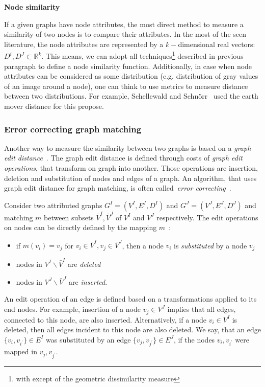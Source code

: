 \textbf{Node similarity}

If a given graphs have node attributes, the most direct method to measure a similarity of two nodes is to compare their attributes. In the most of the seen literature, the node attributes are represented by a $k-$dimensional real vectors: $D^i,D^J\subset\mathbb{R}^k$. This means, we can adopt all techniques\footnote{with except of the geometric dissimilarity measure} described in previous paragraph to define a node similarity function. Additionally, in case when node attributes can be considered as some distribution (e.g. distribution of gray values of an image around a node), one can think to use metrics to measure distance between two distributions. For example, Schellewald and Schn\"orr~\cite{Schellewald2005} used the earth mover distance for this propose.
\subsubsection{Error correcting graph matching}
Another way to measure the similarity between two graphs is based on a \emph{graph edit distance}~\cite{Bunke1983_inexactGM}. The graph edit distance is defined through costs of \emph{graph edit operations}, that transform on graph into another. Those operations are insertion, deletion and substitution of nodes and edges of a graph. An algorithm, that uses graph edit distance for graph matching, is often called~\emph{error correcting}~\cite{Conte2004}.

Consider two attributed graphs $G^I = (V^I, E^I,D^I)$ and $G^J = (V^J, E^J,D^J)$ and matching $m$ between subsets $\bar{V}^I,\bar{V}^J$ of $V^I$ and $V^J$ respectively. The edit operations on nodes can be directly defined by the mapping $m$~\cite{Bunke1998_ErrTolerantGM}:
\begin{itemize}
	\item if $m(v_i)=v_j$ for $v_i\in\bar{V}^I,v_j\in\bar{V}^J$, then a node $v_i$ is \emph{substituted} by a node $v_j$
	\item nodes in $V^I\backslash\bar{V}^I$ are \emph{deleted}
	\item nodes in $V^J\backslash\bar{V}^J$ are \emph{inserted}.
\end{itemize}
An edit operation of an edge is defined based on a transformations applied to its end nodes. For example, insertion of a node $v_j\in V^J$ implies that all edges, connected to this node, are also inserted. Alternatively, if a node $v_i\in V^I$ is deleted, then all edges incident to this node are also deleted. We say, that an edge $\{v_i,v_{i^\prime}\}\in E^I$ was substituted by an edge $\{v_j,v_{j^\prime}\}\in E^J$, if the nodes $v_i,v_{i^\prime}$ were mapped in $v_j,v_{j^\prime}$.

